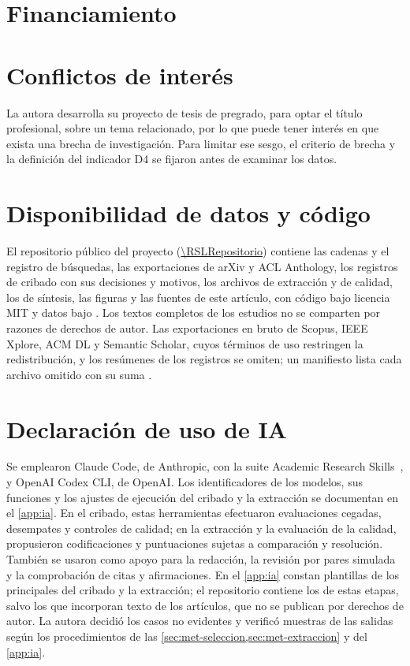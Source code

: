 \section*{Financiamiento}

\RSLFinanciamiento

\section*{Conflictos de interés}

La autora desarrolla su proyecto de tesis de pregrado, para optar el título profesional, sobre un tema relacionado, por lo que puede tener interés en que exista una brecha de investigación. Para limitar ese sesgo, el criterio de brecha y la definición del indicador D4 se fijaron antes de examinar los datos.

\section*{Disponibilidad de datos y código}

El repositorio público del proyecto (\url{\RSLRepositorio}) contiene las cadenas y el registro de búsquedas, las exportaciones de arXiv y ACL Anthology, los registros de cribado con sus decisiones y motivos, los archivos de extracción y de calidad, los  de síntesis, las figuras y las fuentes de este artículo, con código bajo licencia MIT y datos bajo \RSLLicenciaDatos. Los textos completos de los estudios no se comparten por razones de derechos de autor. Las exportaciones en bruto de Scopus, IEEE Xplore, ACM DL y Semantic Scholar, cuyos términos de uso restringen la redistribución, y los resúmenes de los registros se omiten; un manifiesto lista cada archivo omitido con su suma \RSLSuma.

\section*{Declaración de uso de IA}

Se emplearon Claude Code, de Anthropic, con la suite Academic Research Skills~\cite{ARS2026}, y OpenAI Codex CLI, de OpenAI. Los identificadores de los modelos, sus funciones y los ajustes de ejecución del cribado y la extracción se documentan en el \cref{app:ia}. En el cribado, estas herramientas efectuaron evaluaciones cegadas, desempates y controles de calidad; en la extracción y la evaluación de la calidad, propusieron codificaciones y puntuaciones sujetas a comparación y resolución. También se usaron como apoyo para la redacción, la revisión por pares simulada y la comprobación de citas y afirmaciones. En el \cref{app:ia} constan plantillas de los  principales del cribado y la extracción; el repositorio contiene los  de estas etapas, salvo los que incorporan texto de los artículos, que no se publican por derechos de autor. La autora decidió los casos no evidentes y verificó muestras de las salidas según los procedimientos de las \cref{sec:met-seleccion,sec:met-extraccion} y del \cref{app:ia}.

